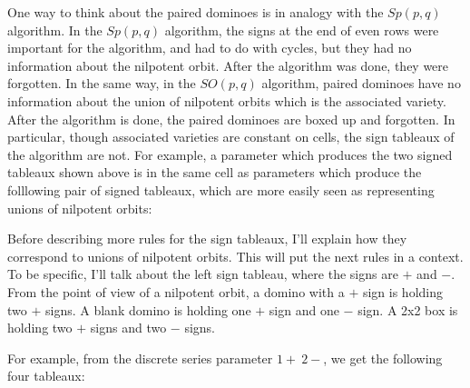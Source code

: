 \documentclass[12pt]{article}
\numberwithin{equation}{section}
\theoremstyle{definition}
\theoremstyle{remark}
\begin{document}
  One way to think about the paired dominoes is in analogy with the $Sp(p,q)$ algorithm.
  In the $Sp(p,q)$ algorithm, the signs at the end of even rows were important for the algorithm, and had to do with cycles, but they had no information about the nilpotent orbit.
  After the algorithm was done, they were forgotten.
  In the same way, in the $SO(p,q)$ algorithm, paired dominoes have no information about the union of nilpotent orbits which is the associated variety.
  After the algorithm is done, the paired dominoes are boxed up and forgotten.
  In particular, though associated varieties are constant on cells, the sign tableaux of the algorithm are not.
  For example, a parameter which produces the two signed tableaux shown above is in the same cell as parameters which produce the folllowing pair of signed tableaux, which are more easily seen as representing unions of nilpotent orbits:
  \begin{figure}[H]
    \centering
  \end{figure}

  Before describing more rules for the sign tableaux, I'll explain how they correspond to unions of nilpotent orbits.
  This will put the next rules in a context.
  To be specific, I'll talk about the left sign tableau, where the signs are $+$ and $-$.
  From the point of view of a nilpotent orbit, a domino with a $+$ sign is holding two $+$ signs.
  A blank domino is holding one $+$ sign and one $-$ sign.
  A 2x2 box is holding two $+$ signs and two $-$ signs.

  For example, from the discrete series parameter $1{+}\ 2-$, we get the following four tableaux:
  \begin{figure}[H]
    \centering
  \end{figure}
\end{document}
